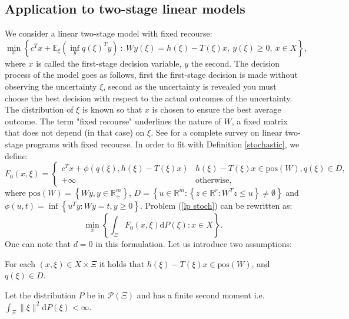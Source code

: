 \documentclass{amsart}
\newcommand{\RR}{\mathbb{R}}
\begin{document}
\subsection{Application to two-stage linear models}\label{two stage}
We consider a linear two-stage model with fixed recourse: 
\begin{equation}\label{lp stoch}
    \min_x\left\{c^Tx + \mathbb{E}_\xi\left(\inf_y q\left(\xi\right)^Ty \right)\: :\: Wy\left(\xi\right)=h\left(\xi\right)-T\left(\xi\right)x,\: y\left(\xi\right)\geq0,\: x\in X \right\},
\end{equation}
where $x$ is called the first-stage decision variable, $y$ the second. The decision process of the model goes as follows, first the first-stage decision is made without observing the uncertainty $\xi$, second as the uncertainty is revealed you must choose the best decision with respect to the actual outcomes of the uncertainty. The distribution of $\xi$ is known so that $x$ is chosen to ensure the best average outcome. The term "fixed recourse" underlines the nature of $W$, a fixed matrix that does not depend (in that case) on $\xi$. See \cite{wets_stochastic_1974} for a complete survey on linear two-stage programs with fixed recourse. In order to fit with Definition \ref{stochastic}, we define:
$$
F_0\left(x,\xi\right)=\begin{cases} 
  c^Tx + \phi\left(q\left(\xi\right), h\left(\xi\right) -T\left(\xi\right)x\right) & h\left(\xi\right)-     T\left(\xi\right)x \in \text{pos}\left(W\right), q\left(\xi\right) \in D, \\
  +\infty & \text{otherwise},
\end{cases}
$$
where $\text{pos}(W)=\left\{Wy, y\in\RR_+^m\right\}$, $D=\left\{u\in\RR^m:\left\{z\in\RR^r:W^Tz \leq u\right\}\ne \emptyset\right\}$ and  \\$\phi\left(u,t\right)=\inf\left\{ u^Ty : Wy=t, y\geq0\right\}$. Problem (\ref{lp stoch}) can be rewritten as:
\begin{equation}\label{rewrite}
    \min_x\left\{\int_\Xi F_0\left(x,\xi\right)\text{d}P\left(\xi\right): x\in X\right\}. 
\end{equation}
One can note that $d=0$ in this formulation. Let us introduce two assumptions: 
\begin{assumption}\label{h1} For each $\left(x,\xi\right)\in X\times \Xi$ it holds that $h\left(\xi\right)- T\left(\xi\right)x\in \text{pos}\left(W\right)$, and $q\left(\xi\right) \in D$.
\end{assumption}
\begin{assumption}
\label{h2} Let the distribution $P$ be in $\mathcal{P}\left(\Xi\right)$ and has a finite second moment i.e. $\int_\Xi \lVert \xi\rVert^2\text{d}P\left(\xi\right) < \infty$.
\end{assumption}
\end{document}
